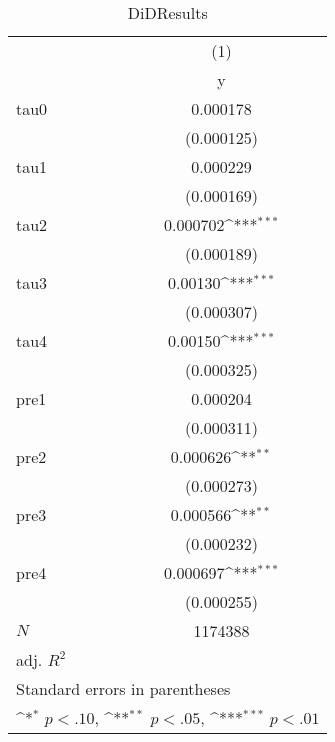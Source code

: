 \begin{table}[htbp]\centering
\def\sym#1{\ifmmode^{#1}\else\(^{#1}\)\fi}
\caption{DiDResults}
\begin{tabular}{l*{1}{c}}
\hline\hline
            &\multicolumn{1}{c}{(1)}\\
            &\multicolumn{1}{c}{y}\\
\hline
tau0        &    0.000178         \\
            &  (0.000125)         \\
[1em]
tau1        &    0.000229         \\
            &  (0.000169)         \\
[1em]
tau2        &    0.000702\sym{***}\\
            &  (0.000189)         \\
[1em]
tau3        &     0.00130\sym{***}\\
            &  (0.000307)         \\
[1em]
tau4        &     0.00150\sym{***}\\
            &  (0.000325)         \\
[1em]
pre1        &    0.000204         \\
            &  (0.000311)         \\
[1em]
pre2        &    0.000626\sym{**} \\
            &  (0.000273)         \\
[1em]
pre3        &    0.000566\sym{**} \\
            &  (0.000232)         \\
[1em]
pre4        &    0.000697\sym{***}\\
            &  (0.000255)         \\
\hline
\(N\)       &     1174388         \\
adj. \(R^{2}\)&                     \\
\hline\hline
\multicolumn{2}{l}{\footnotesize Standard errors in parentheses}\\
\multicolumn{2}{l}{\footnotesize \sym{*} \(p<.10\), \sym{**} \(p<.05\), \sym{***} \(p<.01\)}\\
\end{tabular}
\end{table}
